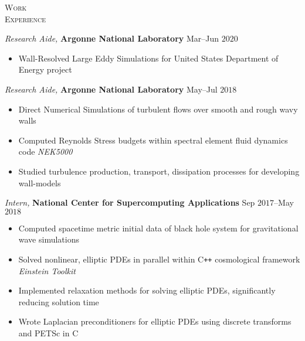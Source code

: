 \documentclass[10pt]{article}
\begin{document}
\begin{multicols}{2}
\textsc{\small Work \\ Experience}
\columnbreak

{\sl Research Aide,} \textbf{Argonne National Laboratory} \hfill Mar--Jun $2020$

\vspace{-1.75em}
\begin{itemize}[label=-]
    \setlength\itemsep{-0.25em}
    \item Wall-Resolved Large Eddy Simulations for United States Department of Energy project
\end{itemize}
\vspace{-2.0em}

\vspace{0.5em}
%
{\sl Research Aide,} \textbf{Argonne National Laboratory} \hfill May--Jul $2018$

\vspace{-1.75em}
\begin{itemize}[label=-]
    \setlength\itemsep{-0.25em}
    \item Direct Numerical Simulations of turbulent flows over smooth and rough wavy walls
    \item Computed Reynolds Stress budgets within spectral element fluid dynamics code \textit{NEK5000}
    \item Studied turbulence production, transport, dissipation processes for developing wall-models
\end{itemize}
\vspace{-2.0em}

\vspace{0.5em}
%
{\sl Intern,} \textbf{National Center for Supercomputing Applications} \hfill Sep $2017$--May $2018$

\vspace{-1.75em}
\begin{itemize}[label=-]
    \setlength\itemsep{-0.25em}
    \item Computed spacetime metric initial data of black hole system for gravitational wave simulations
    \item Solved nonlinear, elliptic PDEs in parallel within C\texttt{++} cosmological framework \textit{Einstein Toolkit}
    \item Implemented relaxation methods for solving elliptic PDEs, significantly reducing solution time
    \item Wrote Laplacian preconditioners for elliptic PDEs using discrete transforms and PETSc in C
\end{itemize}
\vspace{-2.0em}


\end{multicols}
\end{document}
